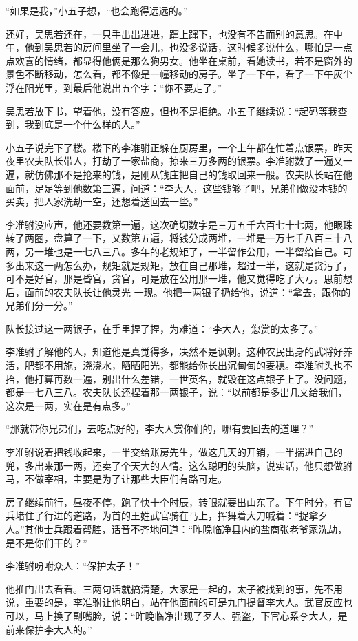 “如果是我，”小五子想，“也会跑得远远的。”

还好，吴思若还在，一只手出出进进，蹿上蹿下，也没有不告而别的意思。在中午，他到吴思若的房间里坐了一会儿，也没多说话，这时候多说什么，哪怕是一点点欢喜的情绪，都显得他俩是那么狗男女。他坐在桌前，看她读书，若不是窗外的景色不断移动，怎么看，都不像是一幢移动的房子。坐了一下午，看了一下午灰尘浮在阳光里，到最后他说出五个字：“你不要走了。”

吴思若放下书，望着他，没有答应，但也不是拒绝。小五子继续说：“起码等我查到，我到底是一个什么样的人。”

小五子说完下了楼。楼下的李准驸正躲在厨房里，一个上午都在忙着点银票，昨天夜里农夫队长带人，打劫了一家盐商，掠来三万多两的银票。李准驸数了一遍又一遍，就仿佛那不是抢来的钱，是刚从钱庄把自己的钱取回来一般。农夫队长站在他面前，足足等到他数第三遍，问道：“李大人，这些钱够了吧，兄弟们做没本钱的买卖，把人家洗劫一空，还想着送回去一些。”

李准驸没应声，他还要数第一遍，这次确切数字是三万五千六百七十七两，他眼珠转了两圈，盘算了一下，又数第五遍，将钱分成两堆，一堆是一万七千八百三十八两，另一堆也是一七八三八。多年的老规矩了，一半留作公用，一半留给自己。可多出来这一两怎么办，规矩就是规矩，放在自己那堆，超过一半，这就是贪污了，可不是好官，那是昏官，贪官，可是放在公用那一堆，他又觉得吃了大亏。思前想后，面前的农夫队长让他灵光
一现。他把一两银子扔给他，说道：“拿去，跟你的兄弟们分一分。”

队长接过这一两银子，在手里捏了捏，为难道：“李大人，您赏的太多了。”

李准驸了解他的人，知道他是真觉得多，决然不是讽刺。这种农民出身的武将好养活，肥都不用施，浇浇水，晒晒阳光，都能给你长出沉甸甸的麦穗。李准驸头也不抬，他打算再数一遍，别出什么差错，一世英名，就毁在这点银子上了。没问题，都是一七八三八。农夫队长还捏着那一两银子，说：“以前都是多出几文给我们，这次是一两，实在是有点多。”

“那就带你兄弟们，去吃点好的，李大人赏你们的，哪有要回去的道理？”

李准驸说着把钱收起来，一半交给账房先生，做这几天的开销，一半揣进自己的兜，多出来那一两，还卖了个天大的人情。这么聪明的头脑，说实话，他只想做驸马，不做宰相，主要是为了让那些大臣们有路可走。

房子继续前行，昼夜不停，跑了快十个时辰，转眼就要出山东了。下午时分，有官兵堵住了行进的道路，为首的王姓武官骑在马上，挥舞着大刀喊着：“捉拿歹人。”其他士兵跟着帮腔，话音不齐地问道：“昨晚临净县内的盐商张老爷家洗劫，是不是你们干的？”

李准驸吩咐众人：“保护太子！”

他推门出去看看。三两句话就搞清楚，大家是一起的，太子被找到的事，先不用说，重要的是，李准驸让他明白，站在他面前的可是九门提督李大人。武官反应也可以，马上换了副嘴脸，说：“昨晚临净出现了歹人、强盗，下官心系李大人，是前来保护李大人的。”

